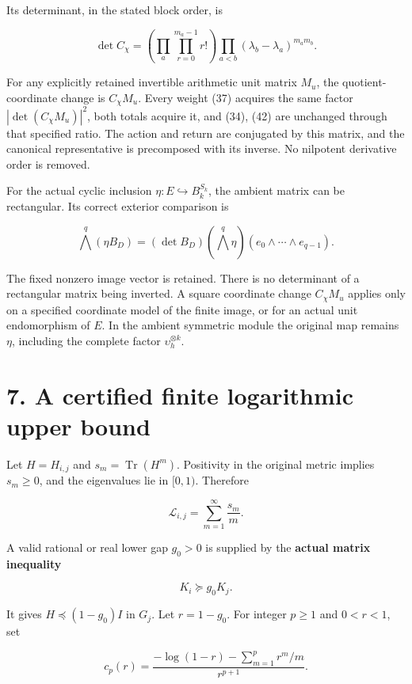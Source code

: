 \documentclass[
  11pt,
]{article}
\begin{document}
Its determinant, in the stated block order, is

\[
 \det C_\chi
 =\left(\prod_a\prod_{r=0}^{m_a-1}r!\right)
  \prod_{a<b}(\lambda_b-\lambda_a)^{m_am_b}.                      \tag{45}
\]

For any explicitly retained invertible arithmetic unit matrix \(M_u\),
the quotient-coordinate change is \(C_\chi M_u\). Every weight (37)
acquires the same factor \(|\det(C_\chi M_u)|^2\), both totals acquire
it, and (34), (42) are unchanged through that specified ratio. The
action and return are conjugated by this matrix, and the canonical
representative is precomposed with its inverse. No nilpotent derivative
order is removed.

For the actual cyclic inclusion \(\eta:E\hookrightarrow B_k^{S_k}\), the
ambient matrix can be rectangular. Its correct exterior comparison is

\[
 \bigwedge^q(\eta B_D)
 = (\det B_D)(\bigwedge^q\eta)(e_0\wedge\cdots\wedge e_{q-1}).
\]

The fixed nonzero image vector is retained. There is no determinant of a
rectangular matrix being inverted. A square coordinate change
\(C_\chi M_u\) applies only on a specified coordinate model of the
finite image, or for an actual unit endomorphism of \(E\). In the
ambient symmetric module the original map remains \(\eta\), including
the complete factor \(\upsilon_h^{\otimes k}\).

\section{7. A certified finite logarithmic upper
bound}\label{a-certified-finite-logarithmic-upper-bound}

Let \(H=H_{i,j}\) and \(s_m=\operatorname{Tr}(H^m)\). Positivity in the
original metric implies \(s_m\ge0\), and the eigenvalues lie in
\([0,1)\). Therefore

\[
 \boxed{\mathcal L_{i,j}=\sum_{m=1}^{\infty}\frac{s_m}{m}.}       \tag{46}
\]

A valid rational or real lower gap \(g_0>0\) is supplied by the
\textbf{actual matrix inequality}

\[
 \boxed{K_i\succeq g_0K_j.}                                      \tag{47}
\]

It gives \(H\preceq(1-g_0)I\) in \(G_j\). Let \(r=1-g_0\). For integer
\(p\ge1\) and \(0<r<1\), set

\[
 c_p(r)=\frac{-\log(1-r)-\sum_{m=1}^pr^m/m}{r^{p+1}}.            \tag{48}
\]
\end{document}
